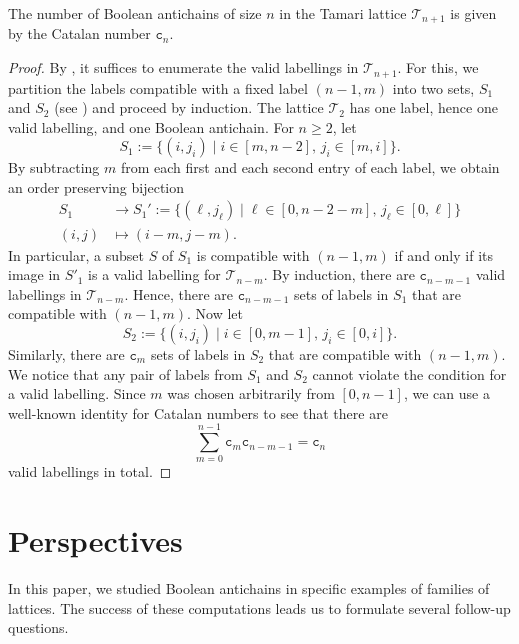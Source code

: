 \documentclass{preprint}
\newcommand{\cT}{\mathcal{T}}
\theoremstyle{definition}
\begin{document}
\begin{theorem}\label{thm: main_thm_tamari_lattice}
    The number of Boolean antichains of size $n$ in the Tamari lattice $\cT_{n+1}$ is given by the Catalan number $\mathtt{c}_n$.
\end{theorem}
\begin{proof}
    By , it suffices to enumerate the valid labellings in $\cT_{n+1}$. For this, we partition the labels compatible with a fixed label $(n-1,m)$ into two sets, $S_1$ and $S_2$ (see ) and proceed by induction. The lattice $\cT_2$ has one label, hence one valid labelling, and one Boolean antichain. For $n\geq 2$, let
    \[
    S_1 := \{(i,j_i) \; | \; i \in [m, n-2], \, j_i \in [m, i ]\}.
    \]
    By subtracting $m$ from each first and each second entry of each label, we obtain an order preserving bijection
    \begin{align*}
    S_1 &\to S_1' 
    := \{(\ell, j_\ell) \; | \; \ell \in [0, n-2-m], \, j_\ell \in [0, \ell]\} \\
    (i,j) &\mapsto (i-m, j-m).
    \end{align*}
    In particular, a subset $S$ of $S_1$ is compatible with $(n-1,m)$ if and only if its image in $S'_1$ is a valid labelling for $\cT_{n-m}$.
    By induction, there are $\mathtt{c}_{n-m-1}$ valid labellings in $\cT_{n-m}$. Hence, there are $\mathtt{c}_{n-m-1}$ sets of labels in $S_1$ that are compatible with $(n-1,m)$. Now let
    \[
    S_2 := \{(i,j_i) \; | \; i \in [0, m-1], \, j_i \in [0, i]\}.
    \]
    Similarly, there are $\mathtt{c}_m$ sets of labels in $S_2$ that are compatible with $(n-1,m)$. We notice that any pair of labels from $S_1$ and $S_2$ cannot violate the condition for a valid labelling. Since $m$ was chosen arbitrarily from $[0,n-1]$, we can use a well-known identity for Catalan numbers \cite{Segner} to see that there are
    \begin{equation*}
        \sum_{m= 0}^{n-1} \mathtt{c}_m \mathtt{c}_{n-m-1} = \mathtt{c}_n
    \end{equation*}
    valid labellings in total.
\end{proof}

\section{Perspectives}\label{sec: Perspectives}
In this paper, we studied Boolean antichains in specific examples of families of lattices. The success of these computations leads us to formulate several follow-up questions.
\end{document}
